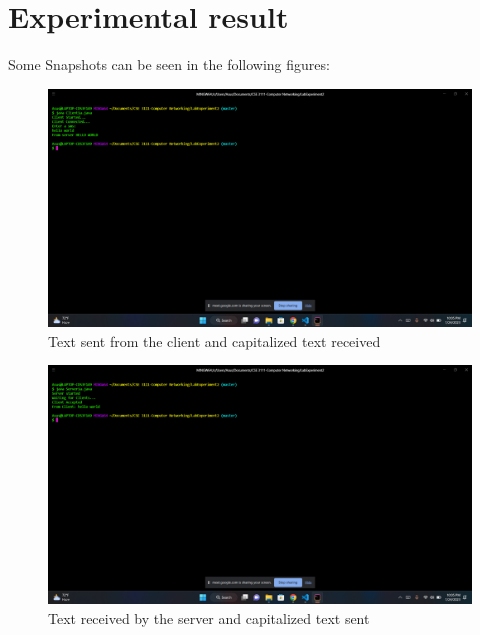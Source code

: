 \documentclass[11pt]{article}
\begin{document}
\newpage


\section{Experimental result}

Some Snapshots can be seen in the following figures: 

\begin{figure}[!h]
\centering
\includegraphics[width=\textwidth]{111.png}
\caption{Text sent from the client and capitalized text received}
\end{figure}

\begin{figure}[!h]
\centering
\includegraphics[width=\textwidth]{112.png}
\caption{Text received by the server and capitalized text sent}
\end{figure}

\newpage
\end{document}
